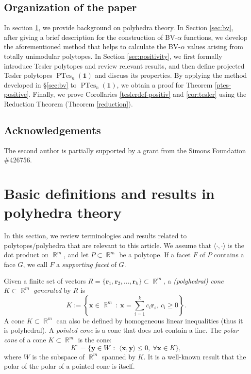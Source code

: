 \documentclass[12pt]{amsart}
\numberwithin{equation}{section}
\theoremstyle{definition}
\def\ptes{\operatorname{PTes}}
\def\1{{\boldsymbol{1}}}
\def\br{\boldsymbol{r}}
\def\bx{\boldsymbol{x}}
\def\by{\boldsymbol{y}}
\def\R{\operatorname{\mathbb{R}}}
\begin{document}
\subsection*{Organization of the paper}

In section \ref{sec:polyhedra}, we provide background on polyhedra theory.
In Section \ref{sec:bv}, after giving a brief description for the construction of BV-$\alpha$ functions, we develop the aforementioned method that helps to calculate the BV-$\alpha$ values arising from totally unimodular polytopes.
In Section \ref{sec:positivity}, we first formally introduce Tesler polytopes and review relevant results, and then define projected Tesler polytopes $\ptes_n(\1)$ and discuss its properties. By applying the method developed in \S \ref{sec:bv} to $\ptes_{n}(\boldsymbol{1})$, we obtain a proof for Theorem \ref{ptes-positive}. Finally, we prove Corollaries \ref{teslerdef-positiv} and \ref{cor:tesler} using the Reduction Theorem (Theorem \ref{reduction}). 


\subsection*{Acknowledgements} The second author is partially supported by a grant from the Simons Foundation \#426756.







\section{Basic definitions and results in polyhedra theory}\label{sec:polyhedra}
In this section, we review terminologies and results related to polytopes/polyhedra that are relevant to this article. 
We assume that $\langle \cdot, \cdot \rangle$ is the dot product on $\R^{m}$,
and let $P \subset \R^m$ be a polytope. If a facet $F$ of $P$ contains a face $G$, we call $F$ a \emph{supporting facet} of $G$. 

Given a finite set of vectors $R=\{\br_1, \br_2, \dots, \br_k\} \subset \R^m$, a \emph{(polyhedral) cone} $K \subset \R^m$ \emph{generated} by $R$ is
\[ K := \left\{ \bx \in \R^m \ : \ \bx = \sum_{i=1}^k c_i \br_i, \ c_i \ge 0\right\}.\]
A cone $K \subset \R^m$ can also be defined by homogeneous linear inequalities (thus it is polyhedral).
A \emph{pointed cone} is a cone that does not contain a line. 
The \emph{polar cone} of a cone $K \subset \R^m$ is the cone:
\[K^{\circ}=\{\by \in W~~:~~\langle \bx,\by \rangle \leq 0, \ \forall \bx \in K\},\] 
where $W$ is the subspace of $\R^m$ spanned by $K$. It is a well-known result that the polar of the polar of a pointed cone is itself.
\end{document}
